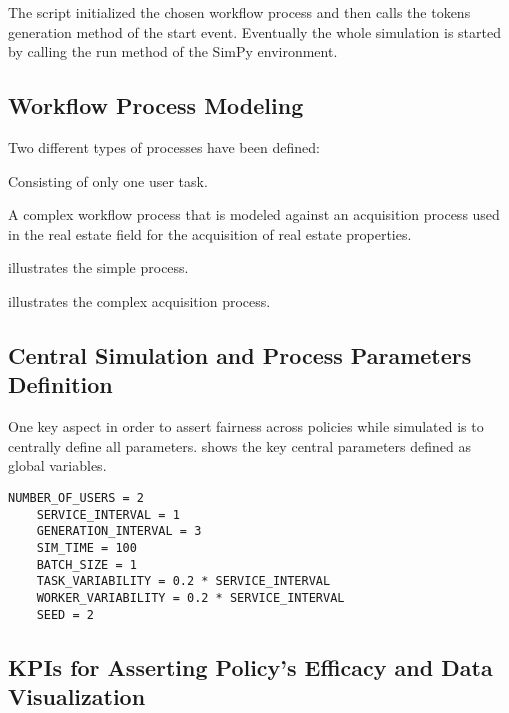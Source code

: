 \documentclass{seal_thesis}
\begin{document}
The script initialized the chosen workflow process and then calls the tokens generation method of the start event. Eventually the whole simulation is started by calling the run method of the SimPy environment.

\subsection{Workflow Process Modeling}

Two different types of processes have been defined:
\begin{enumerate*}
	\item Consisting of only one user task.
	\item A complex workflow process that is modeled against an acquisition process used in the real estate field for the acquisition of real estate properties.
\end{enumerate*}

 illustrates the simple process.


 illustrates the complex acquisition process.


\subsection{Central Simulation and Process Parameters Definition}

One key aspect in order to assert fairness across policies while simulated is to centrally define all parameters.  shows the key central parameters defined as global variables.

\begin{lstlisting}[caption=Central parameters definition that ensures fairness across simulation runs,label=lst:central_parameters,style=CustomPython]
	NUMBER_OF_USERS = 2
	SERVICE_INTERVAL = 1
	GENERATION_INTERVAL = 3
	SIM_TIME = 100
	BATCH_SIZE = 1
	TASK_VARIABILITY = 0.2 * SERVICE_INTERVAL
	WORKER_VARIABILITY = 0.2 * SERVICE_INTERVAL
	SEED = 2
\end{lstlisting}

\subsection{KPIs for Asserting Policy's Efficacy and Data Visualization}
\end{document}
